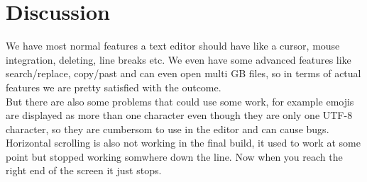 \section{Discussion}\label{sec:discussion}
We have most normal features a text editor should have like a cursor, mouse integration, deleting, line breaks etc.
We even have some advanced features like search/replace, copy/past and can even open multi GB files, so in terms of actual features we are pretty satisfied with the outcome.
\\But there are also some problems that could use some work, for example emojis are displayed as more than one character even though they are only one UTF-8 character, so they are cumbersom to use in the editor and can cause bugs.
\\Horizontal scrolling is also not working in the final build, it used to work at some point but stopped working somwhere down the line. Now when you reach the right end of the screen it just stops.